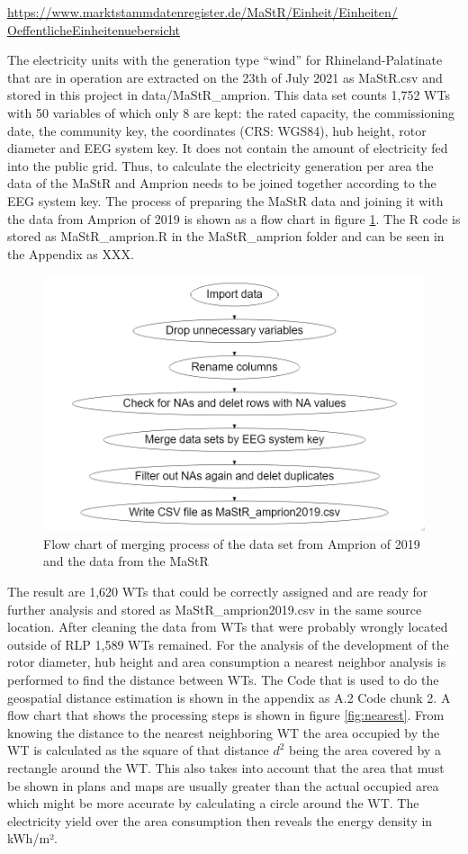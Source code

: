 \documentclass[a4paper,11pt]{article}
\begin{document}
\href{https://www.marktstammdatenregister.de/MaStR/Einheit/Einheiten/OeffentlicheEinheitenuebersicht}{https://www.marktstammdatenregister.de/MaStR/Einheit/Einheiten/
OeffentlicheEinheitenuebersicht}

The electricity units with the generation type ``wind'' for Rhineland-Palatinate that are in operation are extracted on the 23th of July 2021 as MaStR.csv and stored in this project in data/MaStR\_amprion. This data set counts 1,752 WTs with 50 variables of which only 8 are kept: the rated capacity, the commissioning date, the community key, the coordinates (CRS: WGS84), hub height, rotor diameter and EEG system key. It does not contain the amount of electricity fed into the public grid. Thus, to calculate the electricity generation per area the data of the MaStR and Amprion needs to be joined together according to the EEG system key. The process of preparing the MaStR data and joining it with the data from Amprion of 2019 is shown as a flow chart in figure \ref{fig:merge}. The R code is stored as MaStR\_amprion.R in the MaStR\_amprion folder and can be seen in the Appendix as XXX.
\begin{figure}

{\centering \includegraphics[width=0.8\linewidth]{data/MaStR_amprion_join/mergeflow} 

}

\caption{Flow chart of merging process of the data set from Amprion of 2019 and the data from the MaStR}\label{fig:merge}
\end{figure}
The result are 1,620 WTs that could be correctly assigned and are ready for further analysis and stored as MaStR\_amprion2019.csv in the same source location. After cleaning the data from WTs that were probably wrongly located outside of RLP 1,589 WTs remained. For the analysis of the development of the rotor diameter, hub height and area consumption a nearest neighbor analysis is performed to find the distance between WTs. The Code that is used to do the geospatial distance estimation is shown in the appendix as A.2 Code chunk 2. A flow chart that shows the processing steps is shown in figure \ref{fig:nearest}. From knowing the distance to the nearest neighboring WT the area occupied by the WT is calculated as the square of that distance \(d^2\) being the area covered by a rectangle around the WT. This also takes into account that the area that must be shown in plans and maps are usually greater than the actual occupied area which might be more accurate by calculating a circle around the WT. The electricity yield over the area consumption then reveals the energy density in kWh/m².
\end{document}
